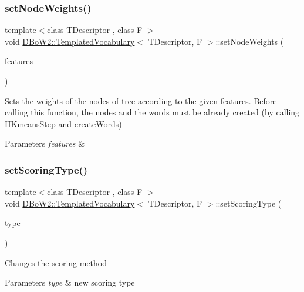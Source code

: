 \subsubsection{\texorpdfstring{set\+Node\+Weights()}{setNodeWeights()}}
{\footnotesize\ttfamily template$<$class T\+Descriptor , class F $>$ \\
void \mbox{\hyperlink{class_d_bo_w2_1_1_templated_vocabulary}{D\+Bo\+W2\+::\+Templated\+Vocabulary}}$<$ T\+Descriptor, F $>$\+::set\+Node\+Weights (\begin{DoxyParamCaption}\item[{const vector$<$ vector$<$ T\+Descriptor $>$ $>$ \&}]{features }\end{DoxyParamCaption})\hspace{0.3cm}{\ttfamily [protected]}}

Sets the weights of the nodes of tree according to the given features. Before calling this function, the nodes and the words must be already created (by calling H\+Kmeans\+Step and create\+Words) 
\begin{DoxyParams}{Parameters}
{\em features} & \\
\hline
\end{DoxyParams}
\mbox{\label{class_d_bo_w2_1_1_templated_vocabulary_a05a6c2f46184618c9ea8368f53e6980c}} 
\subsubsection{\texorpdfstring{set\+Scoring\+Type()}{setScoringType()}}
{\footnotesize\ttfamily template$<$class T\+Descriptor , class F $>$ \\
void \mbox{\hyperlink{class_d_bo_w2_1_1_templated_vocabulary}{D\+Bo\+W2\+::\+Templated\+Vocabulary}}$<$ T\+Descriptor, F $>$\+::set\+Scoring\+Type (\begin{DoxyParamCaption}\item[{\mbox{\hyperlink{namespace_d_bo_w2_aa252a592dd607c6e60dede06ceef2722}{Scoring\+Type}}}]{type }\end{DoxyParamCaption})}

Changes the scoring method 
\begin{DoxyParams}{Parameters}
{\em type} & new scoring type \\
\hline
\end{DoxyParams}
\mbox{\label{class_d_bo_w2_1_1_templated_vocabulary_aa8f63a3379debd40214899d996cfc733}} 
